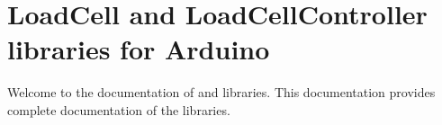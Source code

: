 \chapter{Load\+Cell and Load\+Cell\+Controller libraries for Arduino}
\hypertarget{index}{}\label{index}
Welcome to the documentation of  and  libraries. This documentation provides complete documentation of the libraries. 